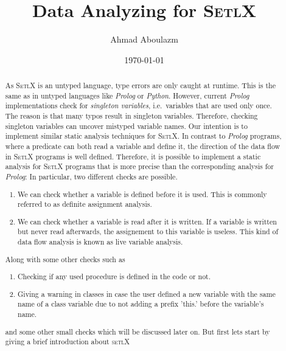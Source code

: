 \documentclass[11pt]{article}
\begin{document}
\begin{Huge}
\title{Data Analyzing for \textsc{SetlX}}
\author{Ahmad Aboulazm}
\date{\today}
\maketitle
\end{Huge}
\pagebreak
\tableofcontents
\pagebreak


\begin{abstract}
As \textsc{SetlX} is an untyped language, type errors are only caught at runtime.  This is the same
as in untyped languages like \textsl{Prolog} or \textsl{Python}.  However, current \textsl{Prolog}
implementations check for \emph{singleton variables}, i.e.~variables that are used only once.  The
reason is that many typos result in singleton variables.  Therefore, checking singleton variables
can uncover mistyped variable names.  Our intention 
is to implement similar static analysis techniques for \textsc{SetlX}.  In contrast to
\textsl{Prolog} programs, where a predicate can both read a variable and define it, the direction of
the data flow in \textsc{SetlX} programs is well defined.  Therefore, it is possible to implement a
static analysis for \textsc{SetlX} programs that is more precise than the corresponding analysis for
\textsl{Prolog}:  In particular, two different checks are possible.

\begin{enumerate}
\item We can check whether a variable is defined before it is used.
      This is commonly referred to as definite assignment analysis.
\item We can check whether a variable is read after it is written.  If a variable is written but
      never read afterwards, the assignement to this variable is useless.  This kind of data flow
      analysis is known as live variable analysis.
\end{enumerate}
Along with some other checks such as 
\begin{enumerate}
\item Checking if any used procedure is defined in the code or not.
\item Giving a warning in classes in case the user defined a new variable with the same name of a class variable due to not adding a prefix 'this.' before the variable's name.
\end{enumerate}
and some other small checks which will be discussed later on. But first lets start by giving a brief introduction about \textsc{setlX} 

\end{abstract}
\end{document}
